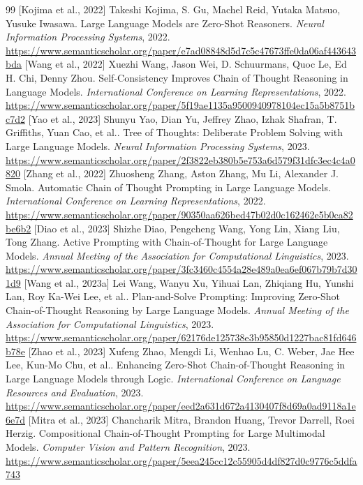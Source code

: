 \documentclass[11pt]{article}
\begin{document}
\begin{thebibliography}{99}
 [Kojima et al., 2022] Takeshi Kojima, S. Gu, Machel Reid, Yutaka Matsuo, Yusuke Iwasawa. Large Language Models are Zero-Shot Reasoners. \emph{Neural Information Processing Systems}, 2022. \url{https://www.semanticscholar.org/paper/e7ad08848d5d7c5c47673ffe0da06af443643bda}
 [Wang et al., 2022] Xuezhi Wang, Jason Wei, D. Schuurmans, Quoc Le, Ed H. Chi, Denny Zhou. Self-Consistency Improves Chain of Thought Reasoning in Language Models. \emph{International Conference on Learning Representations}, 2022. \url{https://www.semanticscholar.org/paper/5f19ae1135a9500940978104ec15a5b8751bc7d2}
 [Yao et al., 2023] Shunyu Yao, Dian Yu, Jeffrey Zhao, Izhak Shafran, T. Griffiths, Yuan Cao, et al.. Tree of Thoughts: Deliberate Problem Solving with Large Language Models. \emph{Neural Information Processing Systems}, 2023. \url{https://www.semanticscholar.org/paper/2f3822eb380b5e753a6d579f31dfc3ec4c4a0820}
 [Zhang et al., 2022] Zhuosheng Zhang, Aston Zhang, Mu Li, Alexander J. Smola. Automatic Chain of Thought Prompting in Large Language Models. \emph{International Conference on Learning Representations}, 2022. \url{https://www.semanticscholar.org/paper/90350aa626bed47b02d0c162462e5b0ca82be6b2}
 [Diao et al., 2023] Shizhe Diao, Pengcheng Wang, Yong Lin, Xiang Liu, Tong Zhang. Active Prompting with Chain-of-Thought for Large Language Models. \emph{Annual Meeting of the Association for Computational Linguistics}, 2023. \url{https://www.semanticscholar.org/paper/3fc3460c4554a28e489a0ea6ef067b79b7d301d9}
 [Wang et al., 2023a] Lei Wang, Wanyu Xu, Yihuai Lan, Zhiqiang Hu, Yunshi Lan, Roy Ka-Wei Lee, et al.. Plan-and-Solve Prompting: Improving Zero-Shot Chain-of-Thought Reasoning by Large Language Models. \emph{Annual Meeting of the Association for Computational Linguistics}, 2023. \url{https://www.semanticscholar.org/paper/62176de125738e3b95850d1227bac81fd646b78e}
 [Zhao et al., 2023] Xufeng Zhao, Mengdi Li, Wenhao Lu, C. Weber, Jae Hee Lee, Kun-Mo Chu, et al.. Enhancing Zero-Shot Chain-of-Thought Reasoning in Large Language Models through Logic. \emph{International Conference on Language Resources and Evaluation}, 2023. \url{https://www.semanticscholar.org/paper/eed2a631d672a4130407f8d69a0ad9118a1e6e7d}
 [Mitra et al., 2023] Chancharik Mitra, Brandon Huang, Trevor Darrell, Roei Herzig. Compositional Chain-of-Thought Prompting for Large Multimodal Models. \emph{Computer Vision and Pattern Recognition}, 2023. \url{https://www.semanticscholar.org/paper/5eea245cc12c55905d4df827d0c9776c5ddfa743}

\end{thebibliography}
\end{document}
